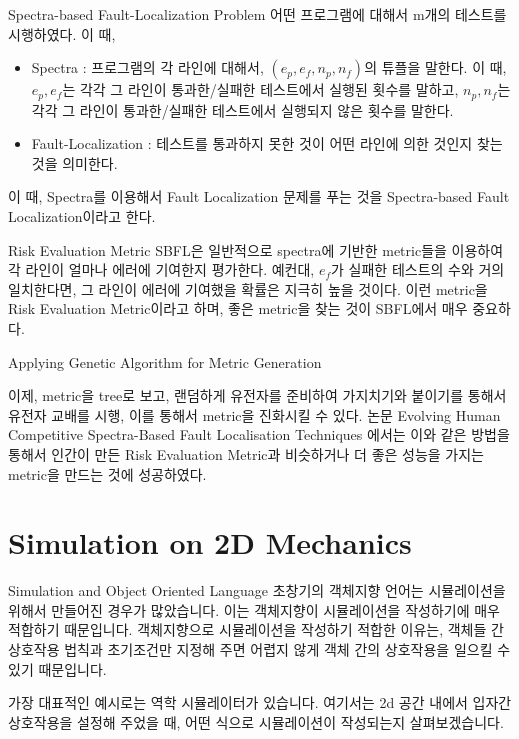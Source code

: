 \documentclass{beamer}
\begin{document}
\begin{frame}{Spectra-based Fault-Localization Problem}
어떤 프로그램에 대해서 m개의 테스트를 시행하였다. 이 때, 
\begin{itemize} 
\item Spectra : 프로그램의 각 라인에 대해서, $(e_p, e_f, n_p, n_f)$의 튜플을 말한다. 이 때, $e_p, e_f$는 각각 그 라인이 통과한/실패한 테스트에서 실행된 횟수를 말하고, $n_p, n_f$는 각각 그 라인이 통과한/실패한 테스트에서 실행되지 않은 횟수를 말한다. 
\item Fault-Localization : 테스트를 통과하지 못한 것이 어떤 라인에 의한 것인지 찾는 것을 의미한다. 
\end{itemize}

이 때, Spectra를 이용해서 Fault Localization 문제를 푸는 것을 Spectra-based Fault Localization이라고 한다. 
\end{frame}

\begin{frame}{Risk Evaluation Metric}
SBFL은 일반적으로 spectra에 기반한 metric들을 이용하여 각 라인이 얼마나 에러에 기여한지 평가한다. 예컨대, $e_f$가 실패한 테스트의 수와 거의 일치한다면, 그 라인이 에러에 기여했을 확률은 지극히 높을 것이다. 이런 metric을 Risk Evaluation Metric이라고 하며, 좋은 metric을 찾는 것이 SBFL에서 매우 중요하다. 
\end{frame}

\begin{frame}{Applying Genetic Algorithm for Metric Generation}

이제, metric을 tree로 보고, 랜덤하게 유전자를 준비하여 가지치기와 붙이기를 통해서 유전자 교배를 시행, 이를 통해서 metric을 진화시킬 수 있다. 논문 Evolving Human Competitive Spectra-Based Fault Localisation Techniques 에서는 이와 같은 방법을 통해서 인간이 만든 Risk Evaluation Metric과 비슷하거나 더 좋은 성능을 가지는 metric을 만드는 것에 성공하였다. 
\end{frame}



\section{Simulation on 2D Mechanics} 

\begin{frame}{Simulation and Object Oriented Language}
초창기의 객체지향 언어는 시뮬레이션을 위해서 만들어진 경우가 많았습니다. 이는 객체지향이 시뮬레이션을 작성하기에 매우 적합하기 때문입니다. 객체지향으로 시뮬레이션을 작성하기 적합한 이유는, 객체들 간 상호작용 법칙과 초기조건만 지정해 주면 어렵지 않게 객체 간의 상호작용을 일으킬 수 있기 때문입니다. 

가장 대표적인 예시로는 역학 시뮬레이터가 있습니다. 여기서는 2d 공간 내에서 입자간 상호작용을 설정해 주었을 때, 어떤 식으로 시뮬레이션이 작성되는지 살펴보겠습니다. 
\end{frame}
\end{document}
